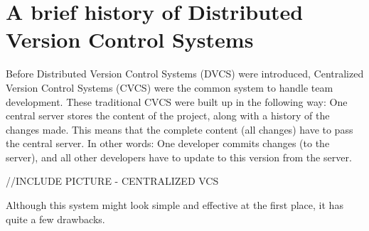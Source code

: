 \section {A brief history of Distributed Version Control Systems}

Before Distributed Version Control Systems (DVCS) were introduced, Centralized Version Control Systems (CVCS) were the common system to handle team development.
These traditional CVCS were built up in the following way: One central server stores the content of the project, along with a history of the changes made. This means that the complete content (all changes) have to pass the central server. In other words: One developer commits changes (to the server), and all other developers have to update to this version from the server.

//INCLUDE PICTURE - CENTRALIZED VCS

Although this system might look simple and effective at the first place, it has quite a few drawbacks.


\cite{branchingstrategies2010}